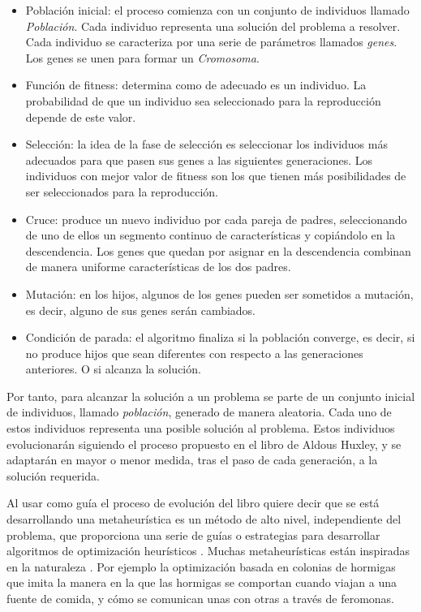 \begin{itemize}
    \item Población inicial: el proceso comienza con un conjunto de individuos llamado \emph{Población}. Cada individuo
    representa una solución del problema a resolver. Cada individuo se caracteriza por una serie de parámetros llamados
    \emph{genes}. Los genes se unen para formar un \emph{Cromosoma}.
    \item Función de fitness: determina como de adecuado es un individuo. La probabilidad de que un individuo sea 
    seleccionado para la reproducción depende de este valor.
    \item Selección: la idea de la fase de selección es seleccionar los individuos más adecuados para que pasen sus
    genes a las siguientes generaciones. Los individuos con mejor valor de fitness son los que tienen más posibilidades
    de ser seleccionados para la reproducción.
    \item Cruce: produce un nuevo individuo por cada pareja de padres, seleccionando de uno de ellos un segmento
    continuo de características y copiándolo en la descendencia. Los genes que quedan por asignar en la descendencia
    combinan de manera uniforme características de los dos padres.
    \item Mutación: en los hijos, algunos de los genes pueden ser sometidos a mutación, es decir, alguno de sus genes
    serán cambiados.
    \item Condición de parada: el algoritmo finaliza si la población converge, es decir, si no produce hijos que sean 
    diferentes con respecto a las generaciones anteriores. O si alcanza la solución.
\end{itemize}

Por tanto, para alcanzar la solución a un problema se parte de un conjunto inicial de individuos, llamado \textit{población},
generado de manera aleatoria. Cada uno de estos individuos representa una posible solución al problema. Estos individuos
evolucionarán siguiendo el proceso propuesto en el libro de Aldous Huxley, y se adaptarán en mayor o menor medida,
tras el paso de cada generación, a la solución requerida.

Al usar como guía el proceso de evolución del libro quiere decir que se está desarrollando una metaheurística es un 
método de alto nivel, independiente del problema, que proporciona una serie de guías o 
estrategias para desarrollar algoritmos de optimización heurísticos \cite{metaheuristics_def}. Muchas metaheurísticas
están inspiradas en la naturaleza \cite{Molina2020ComprehensiveTO}. Por ejemplo la optimización basada en colonias de
hormigas que imita la manera en la que las hormigas se comportan cuando viajan a una fuente de comida, y cómo se 
comunican unas con otras a través de feromonas. 


